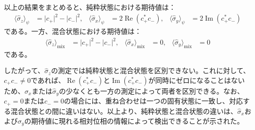 \documentclass[platex,dvipdfmx,a4paper]{jsarticle}
\begin{document}
以上の結果をまとめると、純粋状態における期待値は：
\begin{align*}
  \langle\hat{\sigma}_z\rangle_\psi
  &=\lvert c_+\rvert^2-\lvert c_-\rvert^2,
  &
  \langle\hat{\sigma}_x\rangle_\psi
  &=2\operatorname{Re}\left(c_+^*c_-\right),
  &
  \langle\hat{\sigma}_y\rangle_\psi
  &=2\operatorname{Im}\left(c_+^*c_-\right)
\end{align*}
である。一方、混合状態における期待値は：
\begin{align*}
  \langle\hat{\sigma}_z\rangle_{\mathrm{mix}}
  &=\lvert c_+\rvert^2-\lvert c_-\rvert^2,
  &
  \langle\hat{\sigma}_x\rangle_{\mathrm{mix}}
  &=0,
  &
  \langle\hat{\sigma}_y\rangle_{\mathrm{mix}}
  &=0
\end{align*}
である。

したがって、$\hat{\sigma}_z$の測定では純粋状態と混合状態を区別できない。これに対して、$c_+c_-\neq0$であれば、$\operatorname{Re}(c_+^*c_-)$と$\operatorname{Im}(c_+^*c_-)$が同時にゼロになることはないため、$\hat{\sigma}_x$または$\hat{\sigma}_y$の少なくとも一方の測定によって両者を区別できる。なお、$c_+=0$または$c_-=0$の場合には、重ね合わせは一つの固有状態に一致し、対応する混合状態との間に違いはない。以上より、純粋状態と混合状態の違いは、$\hat{\sigma}_x$および$\hat{\sigma}_y$の期待値に現れる相対位相の情報によって検出できることが示された。
\end{document}

